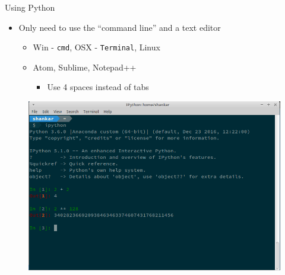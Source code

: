 \documentclass[11pt,professionalfonts]{beamer}
\begin{document}
\begin{frame}{Using Python}
    \begin{itemize}
        \item Only need to use the ``command line'' and a text editor
            \begin{itemize}
                \item Win - \texttt{cmd}, OSX - \texttt{Terminal}, Linux
                \item Atom, Sublime, Notepad++
                    \begin{itemize}
                        \item Use 4 spaces instead of tabs
                    \end{itemize}
            \end{itemize}
    \end{itemize}
    \begin{figure}
        \centering
        \includegraphics[width=\textwidth, height=0.6\textheight, keepaspectratio]{figures/starting_python.png}
    \end{figure}
\end{frame}
\end{document}

